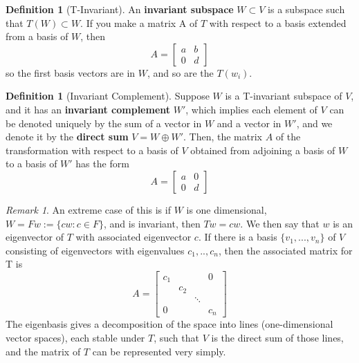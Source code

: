 \documentclass[12pt]{article}
\theoremstyle{definition}
\newtheorem{defn}[thm]{Definition}
\theoremstyle{remark}
\newtheorem{rmk}[thm]{Remark}
\numberwithin{equation}{section}
\newcommand\B[1]{\textbf{ #1}}
\begin{document}
\begin{defn}[T-Invariant]
        An \B{invariant subspace} $W \subset V$ is a subspace such that $T(W) \subset W$. If you make a matrix A of $T$ with respect to a basis extended from a basis of $W$, then \begin{equation}
                A = \left[\begin{array}{c|c} a & b \\ 0 & d \end{array}\right]
        \end{equation}
        so the first basis vectors are in $W$, and so are the $T(w_i)$.
\end{defn}

\vspace{15pt}

\begin{defn}[Invariant Complement]
        Suppose $W$ is a T-invariant subspace of $V$, and it has an \B{invariant complement} $W'$, which implies each element of $V$ can be denoted uniquely by the sum of a vector in $W$ and a vector in $W'$, and we denote it by the \B{direct sum} $V = W\oplus W'$. Then, the matrix $A$ of the transformation with respect to a basis of $V$ obtained from adjoining a basis of $W$ to a basis of $W'$ has the form \begin{equation}
                A = \left[\begin{array}{c|c} a & 0 \\ 0 & d \end{array}\right]
        \end{equation}
\end{defn}

\vspace{15pt}

\begin{rmk}
        An extreme case of this is if $W$ is one dimensional, $W = Fw:= \{cw: c\in F\}$, and is invariant, then $Tw = cw$. We then say that $w$ is an eigenvector of $T$ with associated eigenvector $c$. If there is a basis $\{v_1,...,v_n\}$ of $V$ consisting of eigenvectors with eigenvalues $c_1,..,c_n$, then the associated matrix for T is \begin{equation}
                A = \begin{bmatrix} c_1 & & & 0 \\ & c_2 & & \\ & & \ddots & \\ 0 & & & c_n \end{bmatrix}
        \end{equation}
        The eigenbasis gives a decomposition of the space into lines (one-dimensional vector spaces), each stable under $T$, such that $V$ is the direct sum of those lines, and the matrix of $T$ can be represented very simply.
\end{rmk}
\end{document}
